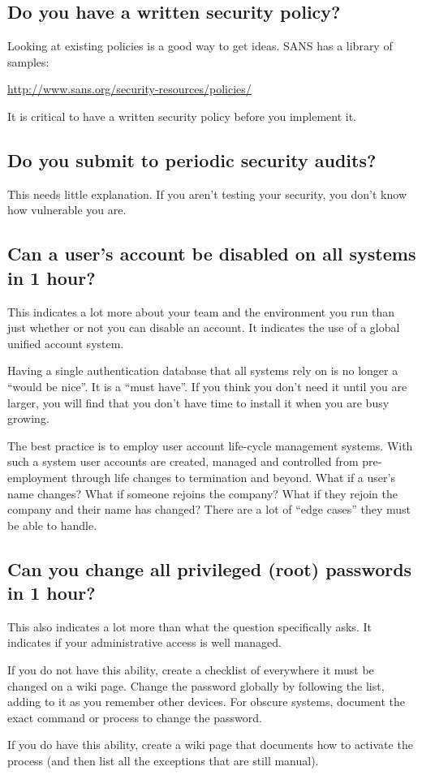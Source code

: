 \documentclass{article}
\begin{document}
\subsection{Do you have a written security policy?}
Looking at existing policies is a good way to get ideas. SANS has a library of samples:

\url{http://www.sans.org/security-resources/policies/}

It is critical to have a written security policy before you implement it.

\subsection{Do you submit to periodic security audits?}
This needs little explanation. If you aren't testing your security, you don't know how vulnerable you are.

\subsection{Can a user's account be disabled on all systems in 1 hour? \Checkmark}
This indicates a lot more about your team and the environment you run than just whether or not you can disable an account. It indicates the use of a global unified account system.

Having a single authentication database that all systems rely on is no longer a ``would be nice''. It is a ``must have''. If you think you don't need it until you are larger, you will find that you don't have time to install it when you are busy growing.

The best practice is to employ user account life-cycle management systems. With such a system user accounts are created, managed and controlled from pre-employment through life changes to termination and beyond. What if a user's name changes? What if someone rejoins the company? What if they rejoin the company and their name has changed? There are a lot of ``edge cases'' they must be able to handle.

\subsection{Can you change all privileged (root) passwords in 1 hour? \Checkmark}
This also indicates a lot more than what the question specifically asks. It indicates if your administrative access is well managed.

If you do not have this ability, create a checklist of everywhere it must be changed on a wiki page. Change the password globally by following the list, adding to it as you remember other devices. For obscure systems, document the exact command or process to change the password.

If you do have this ability, create a wiki page that documents how to activate the process (and then list all the exceptions that are still manual).
\end{document}
